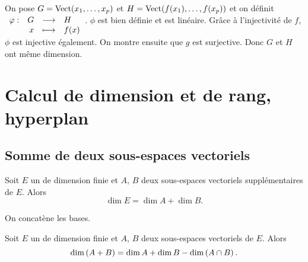 \documentclass{magnolia}
\begin{document}
\begin{sol}
On pose $G=\operatorname{Vect}(x_1,\ldots,x_p)$ et $H=\operatorname{Vect}(f(x_1),\ldots,f(x_p))$ et on définit $\begin{array}[t]{lrcl} \displaystyle{\varphi} : & \displaystyle{G} & \longrightarrow & \displaystyle{H} \\ & \displaystyle{x} & \longmapsto & \displaystyle{f(x)} \end{array}$. $\phi$ est bien définie et est linéaire. Grâce à l'injectivité de $f$, $\phi$ est injective également. On montre ensuite que $g$ est surjective. Donc $G$ et $H$ ont même dimension.
\end{sol}
  


\section{Calcul de dimension et de rang, hyperplan}

\subsection{Somme de deux sous-espaces vectoriels}


\begin{proposition}[utile=2]
Soit $E$ un \Kev de dimension finie et $A$, $B$ deux sous-espaces
vectoriels supplémentaires de $E$. Alors
\[\dim E=\dim A+\dim B.\]
\end{proposition}

\begin{preuve}
On concatène les bases.
\end{preuve}


\begin{proposition}[nom={Formule de \nom{Grassmann}}]
Soit $E$ un \Kev de dimension finie et $A$, $B$ deux sous-espaces vectoriels
de $E$. Alors
\[\dim\left(A+B\right)=\dim A+\dim B-\dim\left(A\cap B\right).\]
\end{proposition}
\end{document}
